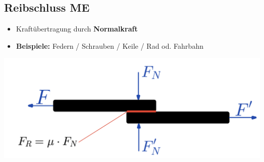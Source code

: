 \subsection{Reibschluss \hfill ME}
\begin{scriptsize}
    \begin{itemize}
        \item Kraftübertragung durch \textbf{Normalkraft}
        \item \textbf{Beispiele:} Federn / Schrauben / Keile / Rad od. Fahrbahn
    \end{itemize}
\end{scriptsize}
\begin{footnotesize}
    \begin{center}
        \includegraphics[width =0.6\linewidth]{MAEIP_Reibschluss}
    \end{center}
\end{footnotesize}
